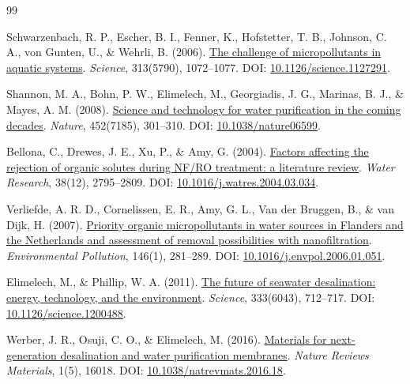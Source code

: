 \documentclass[11pt]{article}
\begin{document}
\begin{thebibliography}{99}

 Schwarzenbach, R. P., Escher, B. I., Fenner, K., Hofstetter, T. B., Johnson, C. A., von Gunten, U., \& Wehrli, B. (2006). \href{https://doi.org/10.1126/science.1127291}{The challenge of micropollutants in aquatic systems}. \textit{Science}, 313(5790), 1072--1077. DOI: \href{https://doi.org/10.1126/science.1127291}{10.1126/science.1127291}.

 Shannon, M. A., Bohn, P. W., Elimelech, M., Georgiadis, J. G., Marinas, B. J., \& Mayes, A. M. (2008). \href{https://doi.org/10.1038/nature06599}{Science and technology for water purification in the coming decades}. \textit{Nature}, 452(7185), 301--310. DOI: \href{https://doi.org/10.1038/nature06599}{10.1038/nature06599}.

 Bellona, C., Drewes, J. E., Xu, P., \& Amy, G. (2004). \href{https://doi.org/10.1016/j.watres.2004.03.034}{Factors affecting the rejection of organic solutes during NF/RO treatment: a literature review}. \textit{Water Research}, 38(12), 2795--2809. DOI: \href{https://doi.org/10.1016/j.watres.2004.03.034}{10.1016/j.watres.2004.03.034}.

 Verliefde, A. R. D., Cornelissen, E. R., Amy, G. L., Van der Bruggen, B., \& van Dijk, H. (2007). \href{https://doi.org/10.1016/j.envpol.2006.01.051}{Priority organic micropollutants in water sources in Flanders and the Netherlands and assessment of removal possibilities with nanofiltration}. \textit{Environmental Pollution}, 146(1), 281--289. DOI: \href{https://doi.org/10.1016/j.envpol.2006.01.051}{10.1016/j.envpol.2006.01.051}.

 Elimelech, M., \& Phillip, W. A. (2011). \href{https://doi.org/10.1126/science.1200488}{The future of seawater desalination: energy, technology, and the environment}. \textit{Science}, 333(6043), 712--717. DOI: \href{https://doi.org/10.1126/science.1200488}{10.1126/science.1200488}.

 Werber, J. R., Osuji, C. O., \& Elimelech, M. (2016). \href{https://doi.org/10.1038/natrevmats.2016.18}{Materials for next-generation desalination and water purification membranes}. \textit{Nature Reviews Materials}, 1(5), 16018. DOI: \href{https://doi.org/10.1038/natrevmats.2016.18}{10.1038/natrevmats.2016.18}.


\end{thebibliography}
\end{document}
